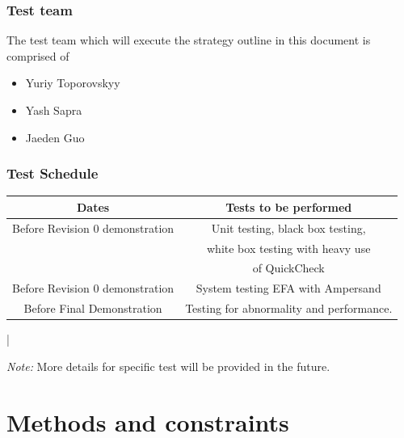 \documentclass[12pt]{report}
\begin{document}
\subsection{Test team}\label{subsec:TestTeam}
The test team which will execute the strategy outline 
in this document is comprised of
\begin{itemize}
\item Yuriy Toporovskyy  
\item Yash Sapra        
\item Jaeden Guo         
\end{itemize}

\subsection{Test Schedule}\label{subsec:TestSched}
\begin{center}
 	\begin{tabular}{| c | c| } \hline
 		Dates & Tests to be performed \\ \hline
 		Before Revision 0 demonstration & Unit testing, black box testing, \\ & white 
 		box 
 		testing with heavy use \\ & of QuickCheck  \\ \hline
 		Before Revision 0 demonstration & System testing EFA with Ampersand  \\  \hline
 	 Before Final Demonstration & Testing for abnormality and performance. \\ 
 	 \hline     
 	\end{tabular}
 \end{center}|

 \emph{Note:} More details for specific test will be provided in the future.
\chapter{Methods and constraints}\label{ch:Methods}
\end{document}
